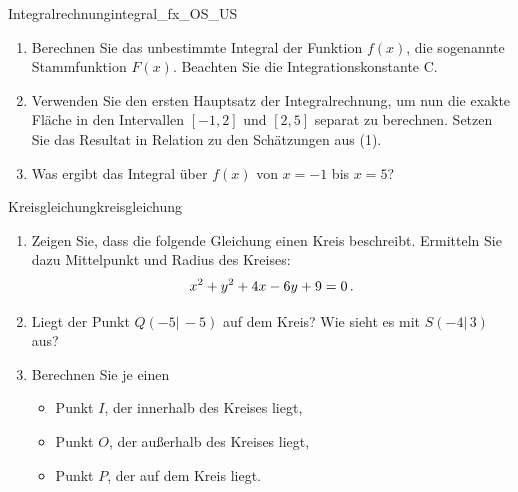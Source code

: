 \documentclass[ngerman]{scrreprt}
\begin{document}
\begin{aufgabebox}{Integralrechnung}{integral_fx_OS_US}
\begin{enumerate}
\begin{enumerate}
        \item der Obersumme,
        \item der Untersumme,
    \end{enumerate}
    jeweils mit der Schrittweite $\Delta x = \num{0.5}$. Skizzieren Sie die entsprechenden Rechtecke.
    \item Berechnen Sie das unbestimmte Integral der Funktion $f(x)$, die sogenannte Stammfunktion $F(x)$. Beachten Sie die Integrationskonstante C.
    \item Verwenden Sie den ersten Hauptsatz der Integralrechnung, um nun die exakte Fläche in den Intervallen $[-1,2]$ und $[2, 5]$ separat zu berechnen. Setzen Sie das Resultat in Relation zu den Schätzungen aus (1).
    \item Was ergibt das Integral über $f(x)$ von $x = -1$ bis $x = 5$?
\end{enumerate}
\end{aufgabebox}


\begin{aufgabebox}{Kreisgleichung}{kreisgleichung}
\begin{enumerate}
    \item Zeigen Sie, dass die folgende Gleichung einen Kreis beschreibt. Ermitteln Sie dazu Mittelpunkt und Radius des Kreises:
    \begin{equation}
        x^{2}+y^{2}+4x-6y+9=0 \,.
    \end{equation}
    \item Liegt der Punkt $Q(-5|\,-5)$ auf dem Kreis? Wie sieht es mit $S(-4|\,3)$ aus?
    \item Berechnen Sie je einen
    \begin{itemize}
        \item Punkt $I$, der innerhalb des Kreises liegt,
        \item Punkt $O$, der außerhalb des Kreises liegt,
        \item Punkt $P$, der auf dem Kreis liegt.
    \end{itemize}
\end{enumerate}
\end{aufgabebox}
\end{document}
